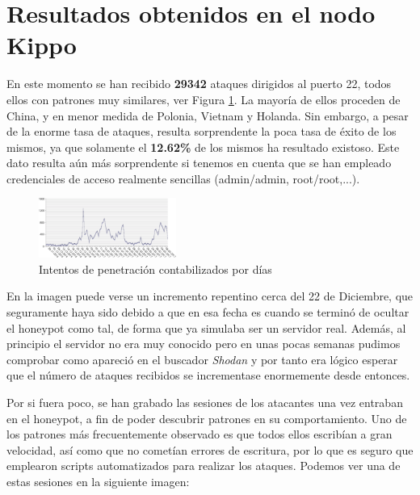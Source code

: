 \documentclass[journal]{IEEEtran}
\begin{document}
\section{Resultados obtenidos en el nodo Kippo}

En este momento se han recibido \textbf{29342} ataques dirigidos al puerto 22, todos ellos con patrones muy similares, ver Figura \ref{fig:pruebas_dia}. La mayoría de ellos proceden de China, y en menor medida de Polonia, Vietnam y Holanda. Sin embargo, a pesar de la enorme tasa de ataques, resulta sorprendente la poca tasa de éxito de los mismos, ya que solamente el \textbf{12.62\%} de los mismos ha resultado existoso. Este dato resulta aún más sorprendente si tenemos en cuenta que se han empleado credenciales de acceso realmente sencillas (admin/admin, root/root,...).

\begin{figure}[H]
\centering
\includegraphics[width=0.4\textwidth]{img/pruebas_dia}
\caption{Intentos de penetración contabilizados por días}
\label{fig:pruebas_dia}
\end{figure}

En la imagen puede verse un incremento repentino cerca del 22 de Diciembre, que seguramente haya sido debido a que en esa fecha es cuando se terminó de ocultar el honeypot como tal, de forma que ya simulaba ser un servidor real. Además, al principio el servidor no era muy conocido pero en unas pocas semanas pudimos comprobar como apareció en el buscador \textit{Shodan} \cite{shodan} y por tanto era lógico esperar que el número de ataques recibidos se incrementase enormemente desde entonces.

Por si fuera poco, se han grabado las sesiones de los atacantes una vez entraban en el honeypot, a fin de poder descubrir patrones en su comportamiento. Uno de los patrones más frecuentemente observado es que todos ellos escribían a gran velocidad, así como que no cometían errores de escritura, por lo que es seguro que emplearon scripts automatizados para realizar los ataques. Podemos ver una de estas sesiones en la siguiente imagen:
\end{document}
